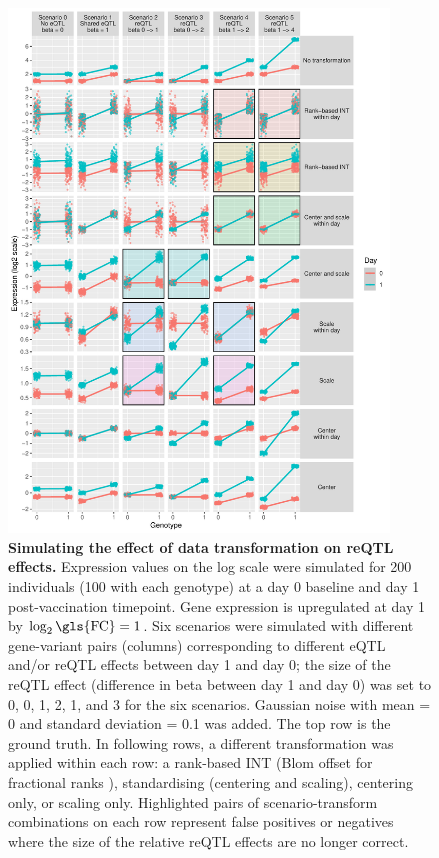 \begin{figure}
    \centering
    \includegraphics[width=0.9\textwidth,page=1]{mainmatter/figures/chapter_03/simulate_expression_transforms.pdf}
    \caption[
    ]{
        \textbf{Simulating the effect of data transformation on \gls{reQTL} effects.}
        Expression values on the log scale were simulated for 200 individuals (100 with each genotype) at a day 0 baseline and day 1 post-vaccination timepoint.
        Gene expression is upregulated at day 1 by $\log_2 \text{\gls{FC}} = 1$.
        Six scenarios were simulated with different gene-variant pairs (columns) corresponding to different \gls{eQTL} and/or \gls{reQTL} effects between day 1 and day 0;
        the size of the \gls{reQTL} effect (difference in beta between day 1 and day 0) was set to 0, 0, 1, 2, 1, and 3 for the six scenarios.
        Gaussian noise with mean = 0 and standard deviation = 0.1 was added.
        The top row is the ground truth.
        In following rows, a different transformation was applied within each row: a rank-based \gls{INT} (Blom offset for fractional ranks \autocite{beasley2009RankBasedInverseNormal,mccaw2020OperatingCharacteristicsRank}), standardising (centering and scaling), centering only, or scaling only.
        Highlighted pairs of scenario-transform combinations on each row represent false positives or negatives where the size of the relative \gls{reQTL} effects are no longer correct.
    }
    \label{fig:hird_reQTL_expressionTransform_sims}
\end{figure}

